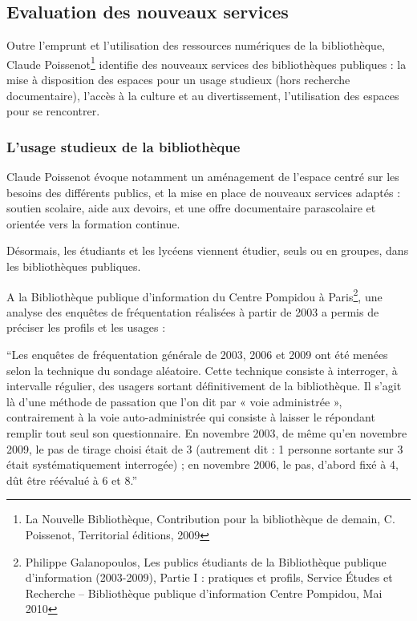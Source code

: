 \documentclass[french,a4paper,12pt]{article}
\begin{document}
\subsection{Evaluation des nouveaux services}

\quad Outre l’emprunt et l’utilisation des ressources numériques de la bibliothèque, Claude Poissenot\footnote{La Nouvelle Bibliothèque, Contribution pour la bibliothèque de demain, C. Poissenot, Territorial éditions, 2009} identifie des nouveaux services des bibliothèques publiques : la mise à disposition des espaces pour un usage studieux (hors recherche documentaire), l’accès à la culture et au divertissement, l’utilisation des espaces pour se rencontrer. 

\subsubsection{L’usage studieux de la bibliothèque }

\quad Claude Poissenot évoque notamment un aménagement de l’espace centré sur les besoins des différents publics, et la mise en place de nouveaux services adaptés :  soutien scolaire, aide aux devoirs, et une offre documentaire parascolaire et orientée vers la formation continue. 

Désormais, les étudiants et les lycéens viennent étudier, seuls ou en groupes, dans les bibliothèques publiques.  

\quad A la Bibliothèque publique d’information du Centre Pompidou à Paris\footnote{Philippe Galanopoulos, Les publics étudiants de la Bibliothèque publique d’information (2003-2009), Partie I : pratiques et profils, Service Études et Recherche – Bibliothèque publique d'information Centre Pompidou, Mai 2010}, une analyse des enquêtes de fréquentation réalisées à partir de 2003 a permis de préciser les profils et les usages : 

“Les enquêtes de fréquentation générale de 2003, 2006 et 2009 ont été menées selon la technique du sondage aléatoire. Cette technique consiste à interroger, à intervalle régulier, des usagers sortant définitivement de la bibliothèque. Il s’agit là d’une méthode de passation que l’on dit par « voie administrée », contrairement à la voie auto-administrée qui consiste à laisser le répondant remplir tout seul son questionnaire. En novembre 2003, de même qu’en novembre 2009, le pas de tirage choisi était de 3 (autrement dit : 1 personne sortante sur 3 était systématiquement interrogée) ; en novembre 2006, le pas, d’abord fixé à 4, dût être réévalué à 6 et 8.” 
\end{document}
